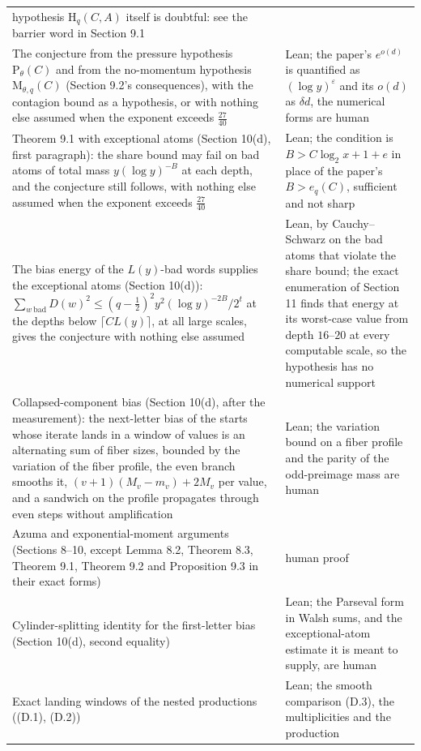 \documentclass[11pt,a4paper]{article}
\begin{document}
\begin{longtable}[]{@{}
  >{\raggedright\arraybackslash}p{}
  >{\raggedright\arraybackslash}p{}@{}}
hypothesis \(\mathrm H_q(C,A)\) itself is doubtful: see the barrier word
in Section 9.1 \\
The conjecture from the pressure hypothesis \(\mathrm P_\theta(C)\) and
from the no-momentum hypothesis \(\mathrm M_{\theta,q}(C)\) (Section
9.2's consequences), with the contagion bound as a hypothesis, or with
nothing else assumed when the exponent exceeds \(\tfrac{27}{40}\) &
Lean; the paper's \(e^{o(d)}\) is quantified as \((\log y)^\varepsilon\)
and its \(o(d)\) as \(\delta d\), the numerical forms are human \\
Theorem 9.1 with exceptional atoms (Section 10(d), first paragraph): the
share bound may fail on bad atoms of total mass \(y(\log y)^{-B}\) at
each depth, and the conjecture still follows, with nothing else assumed
when the exponent exceeds \(\tfrac{27}{40}\) & Lean; the condition is
\(B>C\log_2x+1+e\) in place of the paper's \(B>e_q(C)\), sufficient and
not sharp \\
The bias energy of the \(L(y)\)-bad words supplies the exceptional atoms
(Section 10(d)):
\(\sum_{w\ \text{bad}}D(w)^2\le(q-\tfrac12)^2y^2(\log y)^{-2B}/2^t\) at
the depths below \(\lceil CL(y)\rceil\), at all large scales, gives the
conjecture with nothing else assumed & Lean, by Cauchy--Schwarz on the
bad atoms that violate the share bound; the exact enumeration of Section
11 finds that energy at its worst-case value from depth \(16\)--\(20\)
at every computable scale, so the hypothesis has no numerical support \\
Collapsed-component bias (Section 10(d), after the measurement): the
next-letter bias of the starts whose iterate lands in a window of values
is an alternating sum of fiber sizes, bounded by the variation of the
fiber profile, the even branch smooths it, \((v+1)(M_v-m_v)+2M_v\) per
value, and a sandwich on the profile propagates through even steps
without amplification & Lean; the variation bound on a fiber profile and
the parity of the odd-preimage mass are human \\
Azuma and exponential-moment arguments (Sections 8--10, except Lemma
8.2, Theorem 8.3, Theorem 9.1, Theorem 9.2 and Proposition 9.3 in their
exact forms) & human proof \\
Cylinder-splitting identity for the first-letter bias (Section 10(d),
second equality) & Lean; the Parseval form in Walsh sums, and the
exceptional-atom estimate it is meant to supply, are human \\
Exact landing windows of the nested productions ((D.1), (D.2)) & Lean;
the smooth comparison (D.3), the multiplicities and the production

\end{longtable}
\end{document}
